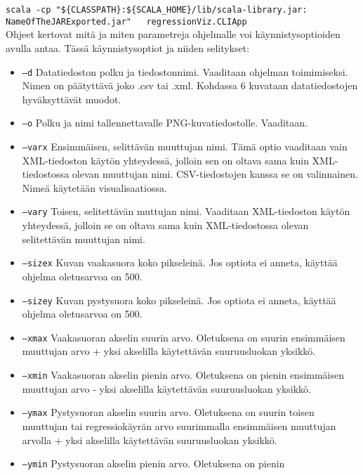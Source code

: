 \documentclass{article}
\begin{document}
    \texttt{scala -cp "\$\{CLASSPATH\}:\$\{SCALA\_HOME\}/lib/scala-library.jar:} \\
    \texttt{NameOfTheJARExported.jar" \, regressionViz.CLIApp}
    \\
        
    Ohjeet kertovat mitä ja miten parametreja ohjelmalle voi käynnistysoptioiden 
	avulla antaa. Tässä käynnistysoptiot ja niiden selitykset: 
    
    \begin{itemize}
        \item \texttt{--d} Datatiedoston polku ja tiedostonnimi. Vaaditaan ohjelman 
		toimimiseksi. Nimen on päätyttävä joko .csv tai .xml. Kohdassa 6 kuvataan 
		datatiedostojen hyväksyttävät muodot.
        \item \texttt{--o} Polku ja nimi tallennettavalle PNG-kuvatiedostolle. Vaaditaan.
        \item \texttt{--varx} Ensimmäisen, selittävän muuttujan nimi. Tämä optio 
		vaaditaan vain XML-tiedoston käytön yhteydessä, jolloin sen on oltava sama 
		kuin XML-tiedostossa olevan muuttujan nimi. CSV-tiedostojen kanssa se on 
		valinnainen. Nimeä käytetään visualisaatiossa.
        \item \texttt{--vary} Toisen, selitettävän muttujan nimi. Vaaditaan 
		XML-tiedoston käytön yhteydessä, jolloin se  on oltava sama kuin 
		XML-tiedostossa olevan selitettävän muuttujan nimi.
        \item \texttt{--sizex} Kuvan vaakasuora koko pikseleinä. Jos optiota 
		ei anneta, käyttää ohjelma oletusarvoa on 500.
        \item \texttt{--sizey} Kuvan pystysuora koko pikseleinä. Jos optiota ei 
		anneta, käyttää ohjelma oletusarvoa on 500.        
        \item \texttt{--xmax} Vaakasuoran akselin suurin arvo. Oletuksena on 
		suurin ensimmäisen muuttujan arvo + yksi akselilla käytettävän suuruusluokan yksikkö.
        \item \texttt{--xmin} Vaakasuoran akselin pienin arvo. Oletuksena on 
		pienin ensimmäisen muuttujan arvo - yksi akselilla käytettävän suuruusluokan yksikkö.
        \item \texttt{--ymax} Pystysuoran akselin suurin arvo. Oletuksena on 
		suurin toisen muuttujan tai regressiokäyrän arvo suurimmalla ensimmäisen 
		muuttujan arvolla + yksi akselilla käytettävän suuruusluokan yksikkö.
        \item \texttt{--ymin} Pystysuoran akselin pienin arvo. Oletuksena on pienin 

\end{itemize}
\end{document}
